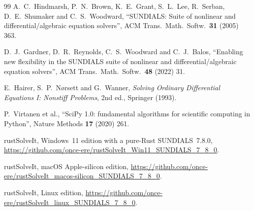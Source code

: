 \documentclass[11pt,a4paper]{article}
\begin{document}
\begin{thebibliography}{99}
 A.~C.~Hindmarsh, P.~N.~Brown, K.~E.~Grant, S.~L.~Lee, R.~Serban,
D.~E.~Shumaker and C.~S.~Woodward, ``SUNDIALS: Suite of nonlinear and differential/algebraic
equation solvers'', ACM Trans.\ Math.\ Softw.\ \textbf{31} (2005) 363.

 D.~J.~Gardner, D.~R.~Reynolds, C.~S.~Woodward and C.~J.~Balos, ``Enabling
new flexibility in the SUNDIALS suite of nonlinear and differential/algebraic equation solvers'',
ACM Trans.\ Math.\ Softw.\ \textbf{48} (2022) 31.

 E.~Hairer, S.~P.~N{\o}rsett and G.~Wanner, \emph{Solving Ordinary
Differential Equations I: Nonstiff Problems}, 2nd ed., Springer (1993).

 P.~Virtanen et al., ``SciPy 1.0: fundamental algorithms for scientific
computing in Python'', Nature Methods \textbf{17} (2020) 261.

 rustSolveIt, Windows~11 edition with a pure-Rust SUNDIALS~7.8.0,
\url{https://github.com/once-ere/rustSolveIt_Win11_SUNDIALS_7_8_0}.

 rustSolveIt, macOS Apple-silicon edition,
\url{https://github.com/once-ere/rustSolveIt_macos-silicon_SUNDIALS_7_8_0}.

 rustSolveIt, Linux edition,
\url{https://github.com/once-ere/rustSolveIt_linux_SUNDIALS_7_8_0}.

\end{thebibliography}
\end{document}
